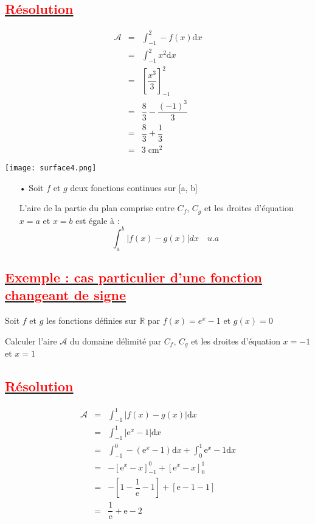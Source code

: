 \documentclass[12pt]{article}
\begin{document}
\subsection*{\underline{\textbf{\textcolor{red}{Résolution}}}}
\begin{eqnarray}
\mathcal{A} &=& \int_{-1}^{2}-f(x)\mathrm{d}x \nonumber \\
            &=& \int_{-1}^{2}x^{2}\mathrm{d}x \nonumber \\
            &=& \left[\dfrac{x^{3}}{3}\right]_{-1}^{2} \nonumber \\
            &=& \dfrac{8}{3} - \dfrac{(-1)^{3}}{3} \nonumber \\
            &=& \dfrac{8}{3} + \dfrac{1}{3} \nonumber \\
            &=& 3\; \text{cm}^{2} \nonumber
\end{eqnarray}
\begin{center}
    \texttt{[image: surface4.png]}
\end{center}
\begin{itemize}
\item[•] Soit $f$ et $g$ deux fonctions continues sur [a, b]

L'aire de la partie du plan comprise entre $C_{f}$, $C_{g}$ et les droites d'équation $x=a$ et $x=b$ est égale à :
\[\int_{a}^{b}|f(x)-g(x)|dx\quad u.a\]
\end{itemize}
\subsection*{\underline{\textbf{\textcolor{red}{Exemple : cas particulier d'une fonction changeant de signe}}}}
Soit $f$ et $g$ les fonctions définies sur $\mathbb{R}$ par $f(x)=e^{x}-1$ et $g(x)=0$

Calculer l'aire $\mathcal{A}$ du domaine délimité par $C_{f}$, $C_{g}$ et les droites d'équation $x=-1$ et $x=1$
\subsection*{\underline{\textbf{\textcolor{red}{Résolution}}}}
\begin{eqnarray}
\mathcal{A} &=& \int_{-1}^{1}|f(x)-g(x)|\mathrm{d}x \nonumber \\
            &=& \int_{-1}^{1}|\mathrm{e}^{x}-1|\mathrm{d}x \nonumber \\
            &=& \int_{-1}^{0}-(\mathrm{e}^{x}-1)\mathrm{d}x+\int_{0}^{1}\mathrm{e}^{x}-1\mathrm{d}x \nonumber \\
            &=& -[\mathrm{e}^{x}-x]_{-1}^{0}+[\mathrm{e}^{x}-x]_{0}^{1} \nonumber \\
            &=& -\left[1-\dfrac{1}{\mathrm{e}}-1\right]+[\mathrm{e}-1-1] \nonumber \\
            &=& \dfrac{1}{\mathrm{e}}+\mathrm{e}-2 \nonumber
\end{eqnarray}
\end{document}

